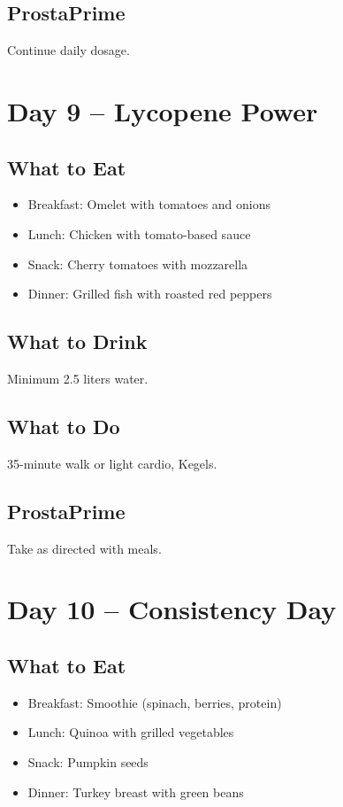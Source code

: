 \documentclass[11pt,oneside]{book}
\begin{document}
\section*{ProstaPrime}
Continue daily dosage.

\clearpage


\chapter*{Day 9 – Lycopene Power}

\section*{What to Eat}
\begin{itemize}[leftmargin=*]
\item Breakfast: Omelet with tomatoes and onions
\item Lunch: Chicken with tomato-based sauce
\item Snack: Cherry tomatoes with mozzarella
\item Dinner: Grilled fish with roasted red peppers
\end{itemize}

\section*{What to Drink}
Minimum 2.5 liters water.

\section*{What to Do}
35-minute walk or light cardio, Kegels.

\section*{ProstaPrime}
Take as directed with meals.

\clearpage


\chapter*{Day 10 – Consistency Day}

\section*{What to Eat}
\begin{itemize}[leftmargin=*]
\item Breakfast: Smoothie (spinach, berries, protein)
\item Lunch: Quinoa with grilled vegetables
\item Snack: Pumpkin seeds
\item Dinner: Turkey breast with green beans
\end{itemize}
\end{document}
